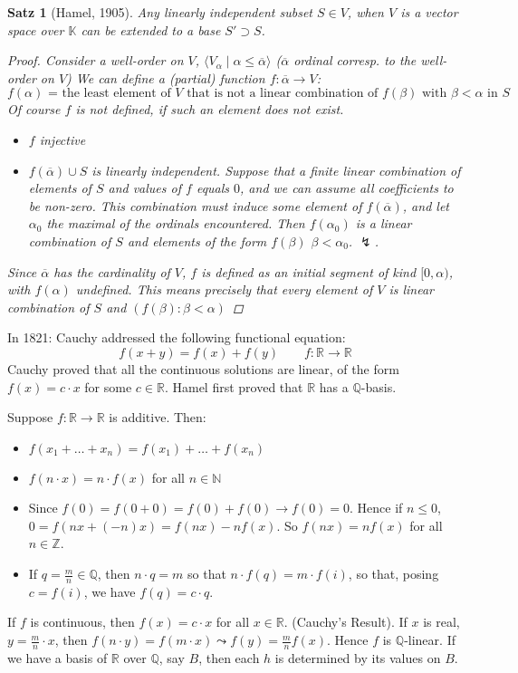 \documentclass[headsepline=true,DIV=11]{scrartcl}
\newtheorem*{theorem}{Satz}
\theoremstyle{definition}
\newenvironment{gelaber}{}{}
\renewcommand{\bar}[1]{\overline{#1}}
\begin{document}
\begin{theorem}[Hamel, 1905]
	Any linearly independent subset $S\in V$, when $V$ is a vector space over $\mathbb K$ can be extended to a base $S'\supset S$.
	\begin{proof}
		Consider a well-order on $V$, $\langle V_\alpha\mid \alpha\le \bar\alpha\rangle$ ($\bar\alpha$ ordinal corresp. to the well-order on $V$)
		We can define a (partial) function $f\colon\bar\alpha\to V$:
		\[\text{$f(\alpha)$ = the least element of $V$ that is not a linear combination of $f(\beta)$ with $\beta<\alpha$ in $S$}\]
		Of course $f$ is not defined, if such an element does not exist.
		\begin{itemize}
			\item $f$ injective
			\item $f(\bar\alpha)\cup S$ is linearly independent. 
				Suppose that a finite linear combination of elements of $S$ and values of $f$ equals $0$, and we can assume all coefficients to be non-zero.
				This combination must induce some element of $f(\bar\alpha)$, and let $\alpha_0$ the maximal of the ordinals encountered.
				Then $f(\alpha_0)$ is a linear combination of $S$ and elements of the form $f(\beta)$ $\beta<\alpha_0$. $\lightning$.
		\end{itemize}
		Since $\bar\alpha$ has the cardinality of $V$, $f$ is defined as an initial segment of kind $[0,\alpha)$, with $f(\alpha)$ undefined.
		This means precisely that every element of $V$ is linear combination of $S$ and $(f(\beta)\colon\beta<\alpha)$ 
	\end{proof}
\end{theorem}

\begin{gelaber}
	In 1821: Cauchy addressed the following functional equation:
	\[f(x+y) = f(x)+f(y) \qquad f\colon \mathbb R\to \mathbb R\]
	Cauchy proved that all the continuous solutions are linear, of the form $f(x)=c\cdot x$ for some $c\in \mathbb R$.
	Hamel first proved that $\mathbb R$ has a $\mathbb Q$-basis.

	Suppose $f\colon \mathbb R\to \mathbb R$ is additive. Then:
	\begin{itemize}
		\item $f(x_1+\ldots+x_n)=f(x_1)+\ldots+f(x_n)$
		\item $f(n\cdot x) = n\cdot f(x)$ for all $n\in \mathbb N$
		\item Since $f(0)= f(0+0)=f(0)+f(0) \to  f(0)=0$.
			Hence if $n\le 0$, $0=f(nx+(-n)x)=f(nx)-nf(x)$.
			So $f(nx) = nf(x)$ for all $n\in \mathbb Z$.
		\item If $q=\frac{m}{n}\in \mathbb Q$, then $n\cdot q=m$ so that $n\cdot f(q)=m\cdot f(i)$, so that, posing $c= f(i)$, we have $f(q)=c\cdot q$.
	\end{itemize}
	If $f$ is continuous, then $f(x)=c\cdot x$ for all $x\in \mathbb R$. (Cauchy's Result).
	If $x$ is real, $y=\frac{m}{n}\cdot x$, then $f(n\cdot y)= f(m\cdot x) \leadsto f(y) = \frac{m}{n} f(x)$.
	Hence $f$ is $\mathbb Q$-linear.
	If we have a basis of $\mathbb R$ over $\mathbb Q$, say $B$, then each $h$ is determined by its values on $B$.
\end{gelaber}
\end{document}
